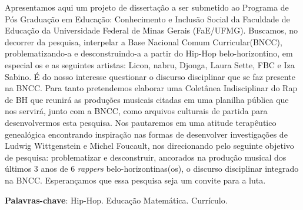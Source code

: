 
\linespread{1}
\setlength{\absparsep}{12pt} %
\begin{resumo}
 Apresentamos aqui um projeto de dissertação a ser submetido ao Programa de Pós Graduação em Educação: Conhecimento e Inclusão Social da Faculdade de Educação da Universidade Federal de Minas Gerais (FaE/UFMG). Buscamos, no decorrer da pesquisa, interpelar a Base Nacional Comum Curricular(BNCC), problematizando-a e desconstruindo-a a partir do Hip-Hop belo-horizontino, em especial os e as seguintes artistas: Licon, nabru, Djonga, Laura Sette, FBC e Iza Sabino. É do nosso interesse questionar o discurso disciplinar que se faz presente na BNCC. Para tanto pretendemos elaborar uma Coletânea Indisciplinar do Rap de BH que reunirá as produções musicais citadas em uma planilha pública que nos servirá, junto com a BNCC, como arquivos culturais de partida para desenvolvermos esta pesquisa. Nos pautaremos em uma atitude terapêutico genealógica encontrando inspiração nas formas de desenvolver investigações de Ludwig Wittgenstein e Michel Foucault, nos direcionando pelo seguinte objetivo de pesquisa: problematizar e desconstruir, ancorados na produção musical dos últimos 3 anos de 6 {\em rappers} belo-horizontinas(os), o discurso disciplinar integrado na BNCC. Esperançamos que essa pesquisa seja um convite para a luta.

 \textbf{Palavras-chave}: Hip-Hop. Educação Matemática. Currículo.
\end{resumo}


% 

 

  
